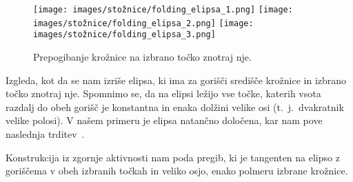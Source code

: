 \begin{figure}[h]
    \centering
    \texttt{[image: images/stožnice/folding\_elipsa\_1.png]}
    \texttt{[image: images/stožnice/folding\_elipsa\_2.png]}
    \texttt{[image: images/stožnice/folding\_elipsa\_3.png]}
    \caption[Prepogibanje elipse]{Prepogibanje krožnice na izbrano točko znotraj nje.}
    \label{fig:koraki_elipsa}
\end{figure}


Izgleda, kot da se nam izriše elipsa, ki ima za gorišči središče krožnice in izbrano točko znotraj nje. Spomnimo se, da na elipsi ležijo vse točke, katerih vsota razdalj do obeh gorišč je konstantna in enaka dolžini velike osi (t.\ j.\ dvakratnik velike polosi). V našem primeru je elipsa natančno določena, kar nam pove naslednja trditev~\cite[str.\ 60--61]{hull2013}.

\begin{trditev}
    Konstrukcija iz zgornje aktivnosti nam poda pregib, ki je tangenten na elipso z goriščema v obeh izbranih točkah in veliko osjo, enako polmeru izbrane krožnice.
\end{trditev}


